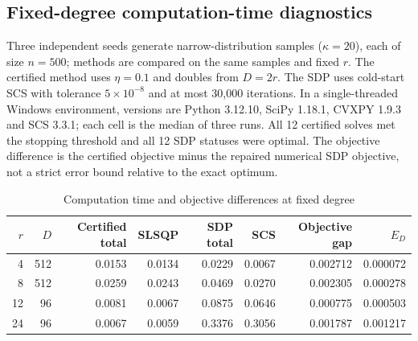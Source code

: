 \subsection{Fixed-degree computation-time diagnostics}
Three independent seeds generate narrow-distribution samples (\(\kappa=20\)), each of size \(n=500\); methods are compared on the same samples and fixed \(r\). The certified method uses \(\eta=0.1\) and doubles from \(D=2r\). The SDP uses cold-start SCS with tolerance \(5\times10^{-8}\) and at most 30,000 iterations. In a single-threaded Windows environment, versions are Python 3.12.10, SciPy 1.18.1, CVXPY 1.9.3 and SCS 3.3.1; each cell is the median of three runs. All 12 certified solves met the stopping threshold and all 12 SDP statuses were optimal. The objective difference is the certified objective minus the repaired numerical SDP objective, not a strict error bound relative to the exact optimum.

\begin{table}[htbp]
\centering
\caption{Computation time and objective differences at fixed degree}\label{tab:t5}
\small
\setlength{\tabcolsep}{4pt}
\begin{tabular}{rrrrrrrr}
\toprule
\(r\) & \(D\) & Certified total & SLSQP & SDP total & SCS & Objective gap & \(E_D\) \\
\midrule
4 & 512 & 0.0153 & 0.0134 & 0.0229 & 0.0067 & 0.002712 & 0.000072 \\
8 & 512 & 0.0259 & 0.0243 & 0.0469 & 0.0270 & 0.002305 & 0.000278 \\
12 & 96 & 0.0081 & 0.0067 & 0.0875 & 0.0646 & 0.000775 & 0.000503 \\
24 & 96 & 0.0067 & 0.0059 & 0.3376 & 0.3056 & 0.001787 & 0.001217 \\
\bottomrule
\end{tabular}
\end{table}


